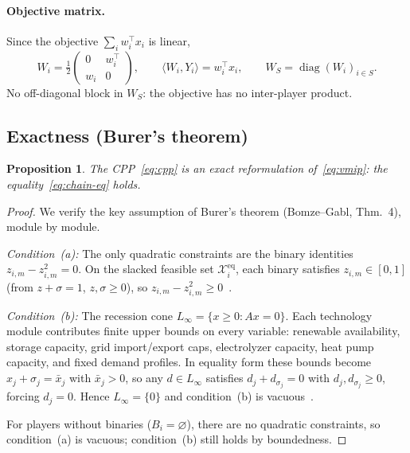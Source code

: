 \documentclass[11pt]{article}
\newtheorem{proposition}{Proposition}
\theoremstyle{definition}
\newcommand{\inner}[2]{\langle #1, #2 \rangle}
\newcommand{\diag}{\operatorname{diag}}
\newcommand{\feaseq}{\mathcal{X}^{\mathrm{eq}}}
\begin{document}
\paragraph{Objective matrix.}
Since the objective $\sum_iw_i^{\top}x_i$ is linear,
\begin{equation}
W_i=\tfrac{1}{2}\begin{pmatrix}0&w_i^{\top}\\w_i&0\end{pmatrix},
\qquad\inner{W_i}{Y_i}=w_i^{\top}x_i,
\qquad W_S=\diag(W_i)_{i\in S}.
\label{eq:Wmat}
\end{equation}
No off-diagonal block in $W_S$: the objective has no inter-player product.

\subsection{Exactness (Burer's theorem)}

\begin{proposition}
\label{prop:exact}
The CPP~\eqref{eq:cpp} is an exact reformulation of~\eqref{eq:vmip}:
the equality~\eqref{eq:chain-eq} holds.
\end{proposition}

\begin{proof}
We verify the key assumption of Burer's theorem (Bomze--Gabl,
Thm.~4), module by module.

\emph{Condition~(a):} The only quadratic constraints are the binary
identities $z_{i,m}-z_{i,m}^2=0$.  On the slacked feasible set
$\feaseq_i$, each binary satisfies $z_{i,m}\in[0,1]$ (from
$z+\sigma=1$, $z,\sigma\ge0$), so
$z_{i,m}-z_{i,m}^2\ge0$~\checkmark.

\emph{Condition~(b):} The recession cone $L_{\infty}=\{x\ge0:Ax=0\}$.
Each technology module contributes finite upper bounds on every
variable: renewable availability, storage capacity, grid import/export
caps, electrolyzer capacity, heat pump capacity, and fixed demand
profiles.  In equality form these bounds become
$x_j+\sigma_j=\bar x_j$ with $\bar x_j>0$, so any $d\in L_{\infty}$
satisfies $d_j+d_{\sigma_j}=0$ with $d_j,d_{\sigma_j}\ge0$, forcing
$d_j=0$.  Hence $L_{\infty}=\{0\}$ and condition~(b) is
vacuous~\checkmark.

For players without binaries ($B_i=\varnothing$), there are no
quadratic constraints, so condition~(a) is vacuous;
condition~(b) still holds by boundedness.
\end{proof}

\end{document}

